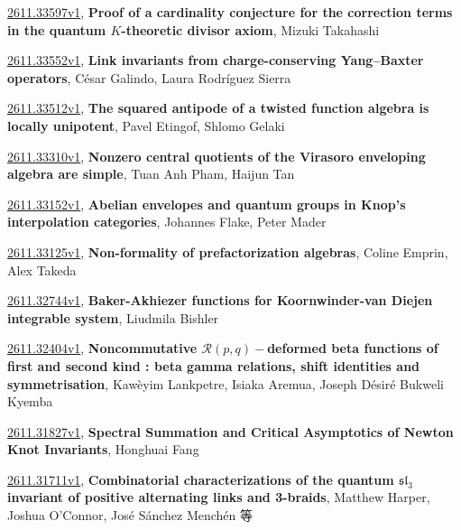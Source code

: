 \documentclass[9pt, a4paper]{article}
\theoremstyle{plain}
\theoremstyle{definition}
\theoremstyle{remark}
\newcommand{\arxiv}[3]{\href{https://arxiv.org/abs/#1}{#1}, \textbf{\textcolor{arxivblue}{#2}}, #3}
\begin{document}
\arxiv{2611.33597v1}{Proof of a cardinality conjecture for the correction terms in the quantum $K$-theoretic divisor axiom}{Mizuki Takahashi}

\arxiv{2611.33552v1}{Link invariants from charge-conserving Yang--Baxter operators}{César Galindo, Laura Rodríguez Sierra}

\arxiv{2611.33512v1}{The squared antipode of a twisted function algebra is locally unipotent}{Pavel Etingof, Shlomo Gelaki}

\arxiv{2611.33310v1}{Nonzero central quotients of the Virasoro enveloping algebra are simple}{Tuan Anh Pham, Haijun Tan}

\arxiv{2611.33152v1}{Abelian envelopes and quantum groups in Knop's interpolation categories}{Johannes Flake, Peter Mader}

\arxiv{2611.33125v1}{Non-formality of prefactorization algebras}{Coline Emprin, Alex Takeda}

\arxiv{2611.32744v1}{Baker-Akhiezer functions for Koornwinder-van Diejen integrable system}{Liudmila Bishler}

\arxiv{2611.32404v1}{Noncommutative $\mathcal{R}(p,q)-$deformed beta functions of first and second kind : beta gamma relations, shift identities and symmetrisation}{Kawèyim Lankpetre, Isiaka Aremua, Joseph Désiré Bukweli Kyemba}

\arxiv{2611.31827v1}{Spectral Summation and Critical Asymptotics of Newton Knot Invariants}{Honghuai Fang}

\arxiv{2611.31711v1}{Combinatorial characterizations of the quantum $\mathfrak{sl}_3$ invariant of positive alternating links and 3-braids}{Matthew Harper, Joshua O'Connor, José Sánchez Menchén 等}

\end{document}
